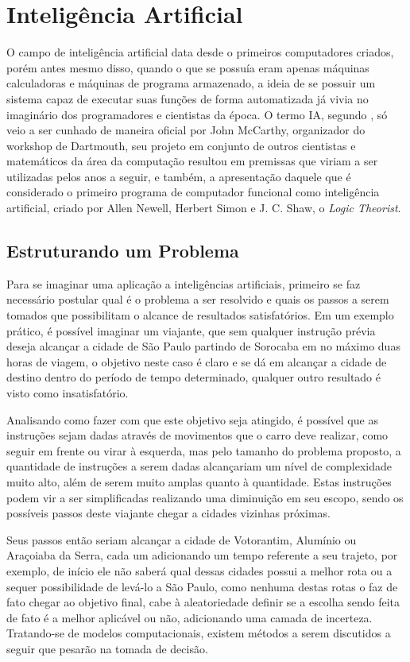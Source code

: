 \chapter{Intelig{\^e}ncia Artificial}

O campo de inteligência artificial data desde o primeiros computadores
criados, porém antes mesmo disso, quando o que se possuía eram apenas
máquinas calculadoras e máquinas de programa armazenado, a ideia de se
possuir um sistema capaz de executar suas funções de forma
automatizada já vivia no imaginário dos programadores e cientistas da
época. O termo IA, segundo , só veio a ser
cunhado de maneira oficial por John McCarthy, organizador do workshop
de Dartmouth, seu projeto em conjunto de outros cientistas e
matemáticos da área da computação resultou em premissas que viriam
a ser utilizadas pelos anos a seguir, e também, a
apresentação daquele que é considerado o primeiro programa de
computador funcional como inteligência artificial, criado por Allen
Newell, Herbert Simon e J. C. Shaw, o \textit{Logic Theorist}.

\section{Estruturando um Problema}

Para se imaginar uma aplicação a inteligências artificiais, primeiro
se faz necessário postular qual é o problema a ser resolvido e quais
os passos a serem tomados que possibilitam o alcance de resultados
satisfatórios. Em um exemplo prático, é possível imaginar um viajante,
que sem qualquer instrução prévia deseja alcançar a cidade de São
Paulo partindo de Sorocaba em no máximo duas horas de viagem, o
objetivo neste caso é claro e se dá em alcançar a cidade de destino
dentro do período de tempo determinado, qualquer outro resultado é
visto como insatisfatório.

Analisando como fazer com que este objetivo seja atingido, é possível
que as instruções sejam dadas através de movimentos que o carro deve
realizar, como seguir em frente ou virar à esquerda, mas pelo tamanho
do problema proposto, a quantidade de instruções a serem dadas
alcançariam um nível de complexidade muito alto, além de serem muito
amplas quanto à quantidade. Estas instruções podem vir a ser
simplificadas realizando uma diminuição em seu escopo, sendo os
possíveis passos deste viajante chegar a cidades vizinhas próximas.

Seus passos então seriam alcançar a cidade de Votorantim, Alumínio ou
Araçoiaba da Serra, cada um adicionando um tempo referente a seu
trajeto, por exemplo, de início ele não saberá qual dessas cidades
possui a melhor rota ou a sequer possibilidade de levá-lo a São Paulo,
como nenhuma destas rotas o faz de fato chegar ao objetivo final, cabe
à aleatoriedade definir se a escolha sendo feita de fato é a melhor
aplicável ou não, adicionando uma camada de incerteza. Tratando-se de
modelos computacionais, existem métodos a serem discutidos a seguir
que pesarão na tomada de decisão.


